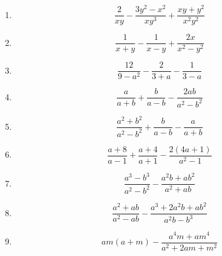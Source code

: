 \begin{exercice}
\begin{multicols}{2}
\begin{enumerate}
\item $$\frac{2}{xy}-\frac{3{{y}^{2}}-{{x}^{2}}}{x{{y}^{3}}}+\frac{xy+{{y}^{2}}}{{{x}^{2}}{{y}^{2}}}$$
\item $$\frac{1}{x+y}-\frac{1}{x-y}+\frac{2x}{{{x}^{2}}-{{y}^{2}}}$$
\item $$\frac{12}{9-{{a}^{2}}}-\frac{2}{3+a}-\frac{1}{3-a}$$
\item $$\frac{a}{a+b}+\frac{b}{a-b}-\frac{2ab}{{{a}^{2}}-{{b}^{2}}}$$
\item $$\frac{{{a}^{2}}+{{b}^{2}}}{{{a}^{2}}-{{b}^{2}}}+\frac{b}{a-b}-\frac{a}{a+b}$$
\item $$\frac{a+8}{a-1}+\frac{a+4}{a+1}-\frac{2(4a+1)}{{{a}^{2}}-1}$$
\item $$\frac{{{a}^{3}}-{{b}^{3}}}{{{a}^{2}}-{{b}^{2}}}-\frac{{{a}^{2}}b+a{{b}^{2}}}{{{a}^{2}}+ab}$$
\item $$\frac{{{a}^{2}}+ab}{{{a}^{2}}-ab}-\frac{{{a}^{3}}+2{{a}^{2}}b+a{{b}^{2}}}{{{a}^{2}}b-{{b}^{3}}}$$
\item $$am(a+m)-\frac{{{a}^{4}}m+a{{m}^{4}}}{{{a}^{2}}+2am+{{m}^{2}}}$$
\end{enumerate}
\end{multicols}
\end{exercice}

